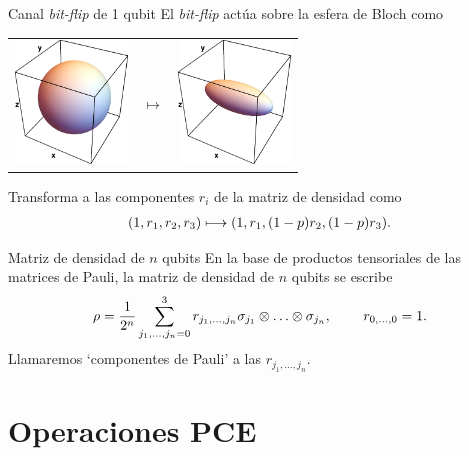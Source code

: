 \documentclass[xcolor=dvipsnames,presentation]{beamer}%
\begin{document}
\begin{frame}{Canal \textit{bit-flip} de 1 qubit}
	El \textit{bit-flip} actúa sobre la esfera de Bloch como
	\begin{center}
	\begin{tabular}{m{2.5cm} m{1.5cm} m{2.5cm}}
		\includegraphics[width=3cm]{images/bloch-ball}
		& \hfill \LARGE{$\longmapsto$} \hfill
		& \includegraphics[width=3cm]{images/bit-flip}
	\end{tabular}
	\end{center}
	
	Transforma a las componentes $r_i$ de la matriz de densidad como
	\begin{align*}
	\qty(1,r_1,r_2,r_3) \longmapsto \qty(1,r_1,\qty(1-p)r_2,\qty(1-p)r_3).
	\end{align*}
\end{frame}

\begin{frame}{Matriz de densidad de $n$ qubits}
	En la base de productos tensoriales de las matrices de Pauli, 
	la matriz de densidad de $n$ qubits se escribe
	\begin{align*}
		\rho = \frac{1}{2^n}\sum _{j_1,\ldots,j_n=0}^3 r_{j_1,\ldots,j_n}
		\sigma_{j_1}\otimes \ldots
		\otimes\sigma_{j_n},\hspace{.8cm} r_{0,\ldots,0}=1.
	\end{align*}
	\alert{Llamaremos `componentes de Pauli' a las $r_{j_1,\ldots,j_n}$.}
\end{frame}

\section{Operaciones PCE}
\label{sec:Theory}
\end{document}
